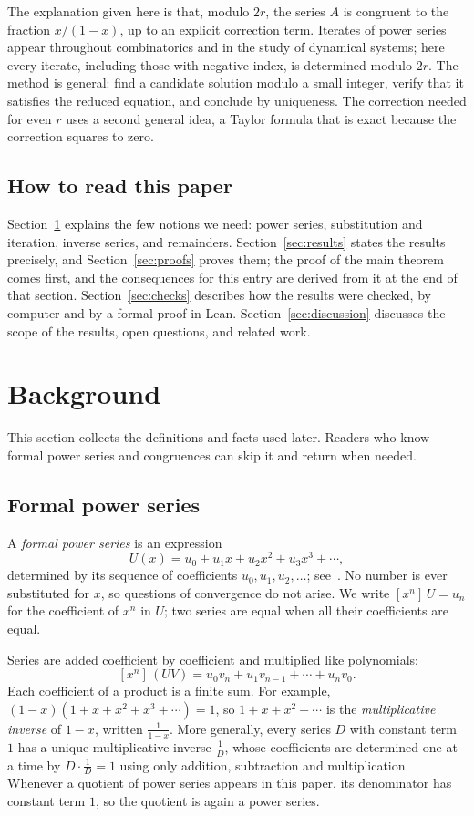 \documentclass[11pt,a4paper]{article}
\theoremstyle{definition}
\theoremstyle{remark}
\newcommand{\coeff}[2]{[x^{#1}]\,#2}
\begin{document}
The explanation given here is that, modulo $2r$, the series $A$ is congruent to the fraction $x/(1-x)$, up to an
explicit correction term. Iterates of power series appear throughout combinatorics and in the study of dynamical
systems; here every iterate, including those with negative index, is determined modulo $2r$. The method is general:
find a candidate solution modulo a small integer, verify that it satisfies the reduced equation, and conclude by
uniqueness. The correction needed for
even $r$ uses a second general idea, a Taylor formula that is exact because the correction squares to zero.

\subsection{How to read this paper}
Section~\ref{sec:background} explains the few notions we need: power series, substitution and iteration, inverse
series, and remainders. Section~\ref{sec:results} states the results precisely, and Section~\ref{sec:proofs} proves
them; the proof of the main theorem comes first, and the consequences for this entry are derived from it at the end of
that section. Section~\ref{sec:checks} describes how the results were checked, by computer and by a formal proof in
Lean. Section~\ref{sec:discussion} discusses the scope of the results, open questions, and related work.
\section{Background}\label{sec:background}
This section collects the definitions and facts used later. Readers who know formal power series and congruences can skip it and return when needed.
\subsection{Formal power series}
A \emph{formal power series} is an expression
\[
U(x)=u_0+u_1x+u_2x^2+u_3x^3+\cdots ,
\]
determined by its sequence of coefficients $u_0,u_1,u_2,\dots$; see~\cite{niven,stanley}. No number is ever
substituted for $x$, so questions of convergence do not arise. We write $\coeff{n}{U}=u_n$ for the coefficient of $x^n$ in $U$; two series are equal
when all their coefficients are equal.

Series are added coefficient by coefficient and multiplied like polynomials:
\[
\coeff{n}{(UV)}=u_0v_n+u_1v_{n-1}+\cdots+u_nv_0 .
\]
Each coefficient of a product is a finite sum. For example, $(1-x)(1+x+x^2+x^3+\cdots)=1$, so $1+x+x^2+\cdots$ is
the \emph{multiplicative inverse} of $1-x$, written $\frac{1}{1-x}$. More generally, every series $D$ with constant term
$1$ has a unique multiplicative inverse $\frac1D$, whose coefficients are determined one at a time by $D\cdot\frac1D=1$
using only addition, subtraction and multiplication. Whenever a quotient of power series appears in this paper, its
denominator has constant term $1$, so the quotient is again a power series.
\end{document}
